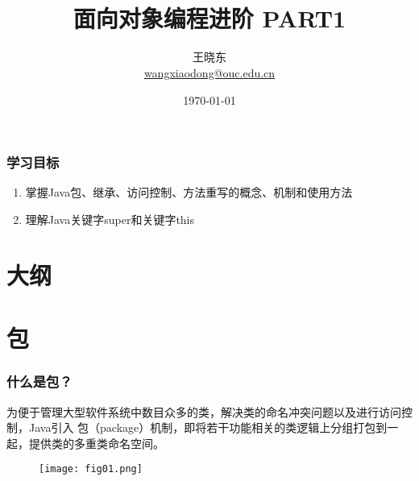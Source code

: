 
\title[JAVA]{\\  
 面向对象编程进阶 PART1}
\author[王晓东]{王晓东\\
  \href{mailto:wangxiaodong@ouc.edu.cn}{\footnotesize wangxiaodong@ouc.edu.cn}}
\date{\today}


 \frame{\titlepage}

\begin{frame}
  \frametitle{学习目标}
  \begin{enumerate}
  \item 掌握Java包、继承、访问控制、方法重写的概念、机制和使用方法
  \item 理解Java关键字super和关键字this
  \end{enumerate}
\end{frame}

\section*{大纲}

\section{包}

\begin{frame}
\frametitle{什么是包？}

为便于管理大型软件系统中数目众多的类，解决类的命名冲突问题以及进行访问控制，Java引入
包（package）机制，即将若干功能相关的类逻辑上分组打包到一起，提供类的多重类命名空间。

\begin{figure}
\centering
\texttt{[image: fig01.png]}
\end{figure}
\end{frame}

